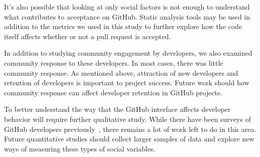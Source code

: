 \documentclass{iitthesis}
\begin{document}
It's also possible that looking at only social factors is not enough to
understand what contributes to acceptance on GitHub. Static analysis tools may
be used in addition to the metrics we used in this study to further explore how
the code itself affects whether or not a pull request is accepted.

In addition to studying community engagement by developers, we also examined
community response to these developers. In most cases, there was little
community response. As mentioned above, attraction of new developers and
retention of developers is important to project success. Future work should how
community response can affect developer retention in GitHub projects.

To better understand the way that the GitHub interface affects developer
behavior will require further qualitative study. While there have been surveys
of GitHub developers previously~\cite{mcdonald_performance_13}, there remains a
lot of work left to do in this area. Future quantitative studies should collect
larger samples of data and explore new ways of measuring these types of social
variables.

\clearpage


%
%

\appendix

%
%




\end{document}
